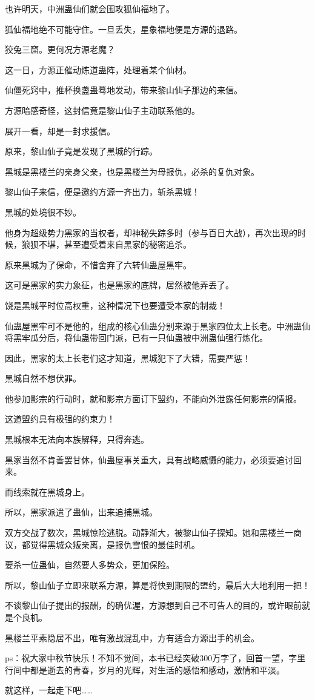 \begin{this_body}
也许明天，中洲蛊仙们就会围攻狐仙福地了。

狐仙福地绝不可能守住。一旦丢失，星象福地便是方源的退路。

狡兔三窟。更何况方源老魔？

这一日，方源正催动炼道蛊阵，处理着某个仙材。

仙僵死窍中，推杯换盏蛊蓦地发动，带来黎山仙子那边的来信。

方源暗感奇怪，这封信竟是黎山仙子主动联系他的。

展开一看，却是一封求援信。

原来，黎山仙子竟是发现了黑城的行踪。

黑城是黑楼兰的亲身父亲，也是黑楼兰为母报仇，必杀的复仇对象。

黎山仙子来信，便是邀约方源一齐出力，斩杀黑城！

黑城的处境很不妙。

他身为超级势力黑家的当权者，却神秘失踪多时（参与百日大战），再次出现的时候，狼狈不堪，甚至遭受着来自黑家的秘密追杀。

原来黑城为了保命，不惜舍弃了六转仙蛊屋黑牢。

这可是黑家的实力象征，也是黑家的底牌，居然被他弄丢了。

饶是黑城平时位高权重，这种情况下也要遭受本家的制裁！

仙蛊屋黑牢可不是他的，组成的核心仙蛊分别来源于黑家四位太上长老。中洲蛊仙将黑牢瓜分后，将仙蛊带回门派，已有一只仙蛊被中洲蛊仙强行炼化。

因此，黑家的太上长老们这才知道，黑城犯下了大错，需要严惩！

黑城自然不想伏罪。

他参加影宗的行动时，就和影宗方面订下盟约，不能向外泄露任何影宗的情报。

这道盟约具有极强的约束力！

黑城根本无法向本族解释，只得奔逃。

黑家当然不肯善罢甘休，仙蛊屋事关重大，具有战略威慑的能力，必须要追讨回来。

而线索就在黑城身上。

所以，黑家派遣了蛊仙，出来追捕黑城。

双方交战了数次，黑城惊险逃脱。动静渐大，被黎山仙子探知。她和黑楼兰一商议，都觉得黑城众叛亲离，是报仇雪恨的最佳时机。

要杀一位蛊仙，自然要人多势众，更加保险。

所以，黎山仙子立即来联系方源，算是将快到期限的盟约，最后大大地利用一把！

不谈黎山仙子提出的报酬，的确优渥，方源想到自己不可告人的目的，或许眼前就是个良机。

黑楼兰平素隐居不出，唯有激战混乱中，方有适合方源出手的机会。

ps：祝大家中秋节快乐！不知不觉间，本书已经突破300万字了，回首一望，字里行间中都是逝去的青春，岁月的光辉，对生活的感悟和感动，激情和平淡。

就这样，一起走下吧……

\end{this_body}

